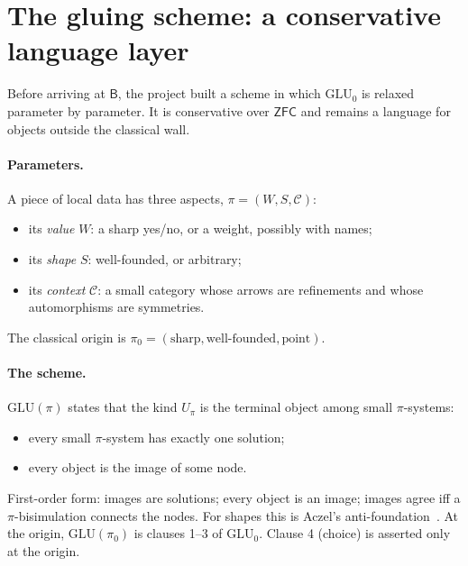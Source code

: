 \documentclass[11pt]{article}
\theoremstyle{definition}
\theoremstyle{remark}
\newcommand{\B}{\mathsf{B}}
\newcommand{\ZFC}{\mathsf{ZFC}}
\newcommand{\GLU}{\mathrm{GLU}}
\begin{document}
\section{The gluing scheme: a conservative language layer}\label{sec:glu}

Before arriving at $\B$, the project built a scheme in which $\GLU_0$ is relaxed parameter by parameter. It is conservative over $\ZFC$ and remains a language for objects outside the classical wall.

\paragraph{Parameters.} A piece of local data has three aspects, $\pi=(W,S,\mathcal C)$:
\begin{itemize}
\item its \emph{value} $W$: a sharp yes/no, or a weight, possibly with names;
\item its \emph{shape} $S$: well-founded, or arbitrary;
\item its \emph{context} $\mathcal C$: a small category whose arrows are refinements and whose automorphisms are symmetries.
\end{itemize}
The classical origin is $\pi_0=(\text{sharp},\text{well-founded},\text{point})$.

\paragraph{The scheme.} $\GLU(\pi)$ states that the kind $U_\pi$ is the terminal object among small $\pi$-systems:
\begin{itemize}
\item every small $\pi$-system has exactly one solution;
\item every object is the image of some node.
\end{itemize}
First-order form: images are solutions; every object is an image; images agree iff a $\pi$-bisimulation connects the nodes. For shapes this is Aczel's anti-foundation~\cite{Aczel88}. At the origin, $\GLU(\pi_0)$ is clauses 1--3 of $\GLU_0$. Clause 4 (choice) is asserted only at the origin.
\end{document}
